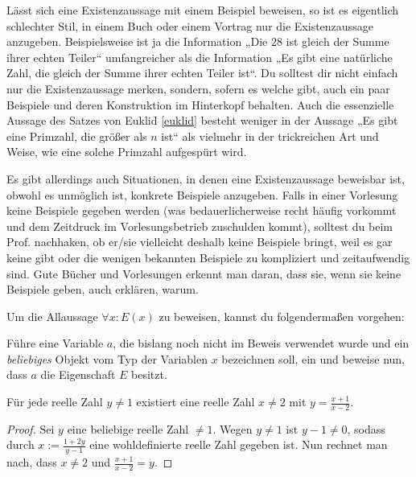   
\begin{bem}
    Lässt sich eine Existenzaussage mit einem Beispiel beweisen, so ist es eigentlich schlechter Stil, in einem Buch oder einem Vortrag nur die Existenzaussage anzugeben. Beispielsweise ist ja die Information „Die $28$ ist gleich der Summe ihrer echten Teiler“ umfangreicher als die Information „Es gibt eine natürliche Zahl, die gleich der Summe ihrer echten Teiler ist“. Du solltest dir nicht einfach nur die Existenzaussage merken, sondern, sofern es welche gibt, auch ein paar Beispiele und deren Konstruktion im Hinterkopf behalten. Auch die essenzielle Aussage des Satzes von Euklid \cref{euklid} besteht weniger in der Aussage „Es gibt eine Primzahl, die größer als $n$ ist“ als vielmehr in der trickreichen Art und Weise, wie eine solche Primzahl aufgespürt wird.
    
    Es gibt allerdings auch Situationen, in denen eine Existenzaussage beweisbar ist, obwohl es unmöglich ist, konkrete Beispiele anzugeben. Falls in einer Vorlesung keine Beispiele gegeben werden (was bedauerlicherweise recht häufig vorkommt und dem Zeitdruck im Vorlesungsbetrieb zuschulden kommt), solltest du beim Prof. nachhaken, ob er/sie vielleicht deshalb keine Beispiele bringt, weil es gar keine gibt oder die wenigen bekannten Beispiele zu kompliziert und zeitaufwendig sind. Gute Bücher und Vorlesungen erkennt man daran, dass sie, wenn sie keine Beispiele geben, auch erklären, warum.
\end{bem}


\begin{axiom}\label{allbeweis} 
    Um die Allaussage $\forall x: E(x)$ zu beweisen, kannst du folgendermaßen vorgehen:
    
    Führe eine Variable $a$, die bislang noch nicht im Beweis verwendet wurde und ein \emph{beliebiges} Objekt vom Typ der Variablen $x$ bezeichnen soll, ein und beweise nun, dass $a$ die Eigenschaft $E$ besitzt.
\end{axiom}


\begin{bsp} \label{bsp:allbeweis}
    Für jede reelle Zahl $y\neq 1$ existiert eine reelle Zahl $x\neq 2$ mit $y=\frac{x+1}{x-2}$.
\end{bsp}
\begin{proof}
    Sei $y$ eine beliebige reelle Zahl $\neq 1$. Wegen $y\neq 1$ ist $y-1\neq 0$, sodass durch $x:= \frac{1+2y}{y-1}$ eine wohldefinierte reelle Zahl gegeben ist. Nun rechnet man nach, dass $x\neq 2$ und $\frac{x+1}{x-2}=y$.
\end{proof}

